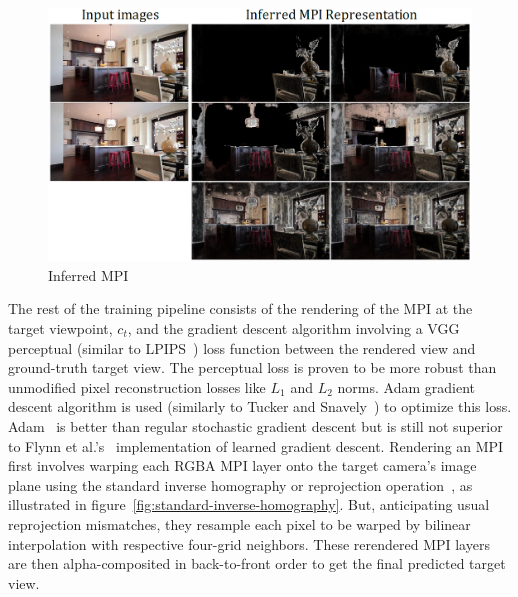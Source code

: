 \begin{figure}[!h]
    \includegraphics[width=0.75\columnwidth]{figures/inferred-mpi.png}
    \caption{Inferred MPI~\cite{zhou2018stereo}}
    \label{fig:inferred-mpi}
\end{figure}

The rest of the training pipeline consists of the rendering of the MPI at the target viewpoint, $c_t$, and the gradient descent algorithm involving a VGG perceptual (similar to LPIPS~\cite{zhang_unreasonable_2018}) loss function between the rendered view and ground-truth target view. The perceptual loss is proven to be more robust than unmodified pixel reconstruction losses like $L_1$ and $L_2$ norms. Adam gradient descent algorithm is used (similarly to Tucker and Snavely~\cite{single_view_mpi}) to optimize this loss. Adam~\cite{kingma_adam_2017} is better than regular stochastic gradient descent but is still not superior to Flynn et al.'s~\cite{flynn_deepview_2019} implementation of learned gradient descent. Rendering an MPI first involves warping each RGBA MPI layer onto the target camera's image plane using the standard inverse homography or reprojection operation~\cite{hartley_multiple_2004}, as illustrated in figure~\ref{fig:standard-inverse-homography}. But, anticipating usual reprojection mismatches, they resample each pixel to be warped by bilinear interpolation with respective four-grid neighbors. These rerendered MPI layers are then alpha-composited in back-to-front order to get the final predicted target view.

